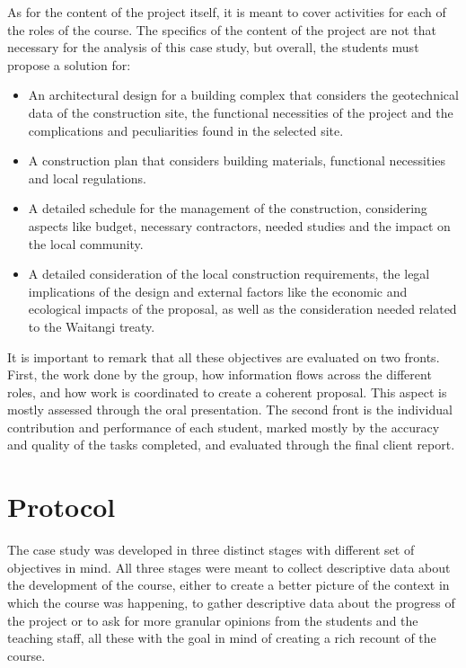 As for the content of the project itself, it is meant to cover activities for each of the roles of the course. The specifics of the content of the project are not that
necessary for the analysis of this case study, but overall, the students must propose a solution for:

\begin{itemize}
    \item An architectural design for a building complex that considers the geotechnical data of the construction site, the functional necessities of the project and the
    complications and peculiarities found in the selected site.
    \item A construction plan that considers building materials, functional necessities and local regulations.
    \item A detailed schedule for the management of the construction, considering aspects like budget, necessary contractors, needed studies and the impact on the local
    community.
    \item A detailed consideration of the local construction requirements, the legal implications of the design and external factors like the economic and ecological
    impacts of the proposal, as well as the consideration needed related to the Waitangi treaty.
\end{itemize}

It is important to remark that all these objectives are evaluated on two fronts. First, the work done by the group, how information flows across the different roles, and
how work is coordinated to create a coherent proposal. This aspect is mostly assessed through the oral presentation. The second front is the individual contribution and
performance of each student, marked mostly by the accuracy and quality of the tasks completed, and evaluated through the final client report.

\section{Protocol \label{sec:6-3}}

The case study was developed in three distinct stages with different set of objectives in mind. All three stages were meant to collect descriptive data about the
development of the course, either to create a better picture of the context in which the course was happening, to gather descriptive data about the progress of the project
or to ask for more granular opinions from the students and the teaching staff, all these with the goal in mind of creating a rich recount of the course.

